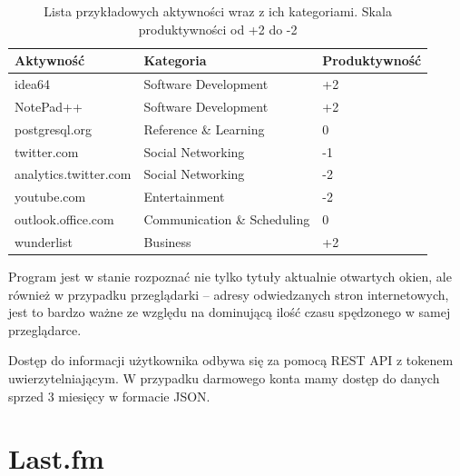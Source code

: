 \documentclass[openright]{xmgr}
\begin{document}
            \begin{table}[]
            \centering
            \begin{tabular}{lll}
                \hline
                \multicolumn{1}{l|}{Aktywność} & \multicolumn{1}{l|}{Kategoria} & Produktywność \\ \hline
                idea64                         & Software Development           & +2            \\
                NotePad++                      & Software Development           & +2            \\
                postgresql.org                 & Reference \& Learning          & 0             \\
                twitter.com                    & Social Networking              & -1            \\
                analytics.twitter.com          & Social Networking              & -2            \\
                youtube.com                    & Entertainment                  & -2            \\
                outlook.office.com             & Communication \& Scheduling    & 0             \\
                wunderlist                     & Business                       & +2
                \end{tabular}
                \caption{
                    Lista przykładowych aktywności wraz z ich kategoriami. Skala produktywności od +2 do -2
                }
                \label{RescueTime --- lista przykładowych aktywności}
            \end{table}

            Program jest w stanie rozpoznać nie tylko tytuły aktualnie otwartych okien,
            ale również w przypadku przeglądarki – adresy odwiedzanych stron internetowych,
            jest to bardzo ważne ze względu na dominującą ilość czasu spędzonego w samej przeglądarce.

            Dostęp do informacji użytkownika odbywa się za pomocą REST API z tokenem uwierzytelniającym.
            W przypadku darmowego konta mamy dostęp do danych sprzed 3 miesięcy w formacie JSON.

        \section*{Last.fm}
\end{document}
